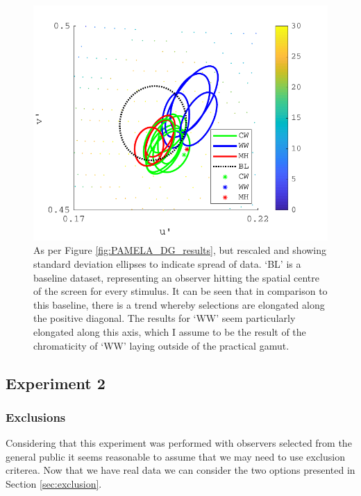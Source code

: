 \begin{figure}[hbtp] %
\includegraphics[max width=\textwidth]{figs/tablet/PAMELA_DG_results_ellipses.pdf} 
\caption{As per Figure \ref{fig:PAMELA_DG_results}, but rescaled and showing standard deviation ellipses to indicate spread of data. `BL' is a baseline dataset, representing an observer hitting the spatial centre of the screen for every stimulus. It can be seen that in comparison to this baseline, there is a trend whereby selections are elongated along the positive diagonal. The results for `WW' seem particularly elongated along this axis, which I assume to be the result of the chromaticity of `WW' laying outside of the practical gamut.}
\label{fig:PAMELA_DG_results_ellipses}
\end{figure}


\clearpage

\subsection{Experiment 2}

\subsubsection{Exclusions}

Considering that this experiment was performed with observers selected from the general public it seems reasonable to assume that we may need to use exclusion criterea. Now that we have real data we can consider the two options presented in Section \ref{sec:exclusion}.

